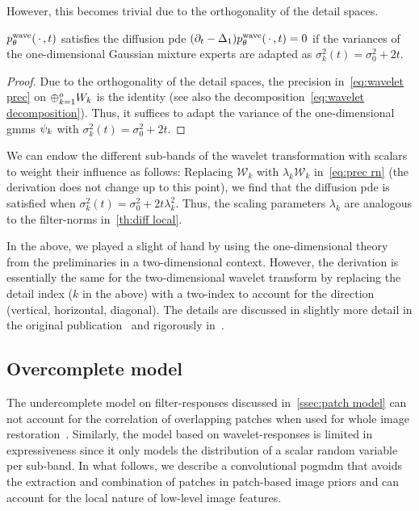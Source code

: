 However, this becomes trivial due to the orthogonality of the detail spaces.
\begin{theorem}%
	\label{th:wavelet diff}
	\( p^{\mathrm{wave}}_\theta(\,\cdot\,, t) \) satisfies the diffusion \gls{pde} \( (\partial_t - \Delta_{\num{1}}) p^{\mathrm{wave}}_\theta(\,\cdot\,, t) = \num{0} \) if the variances of the one-dimensional Gaussian mixture experts are adapted as \( \sigma_k^{\num{2}}(t) = \sigma_{\num{0}}^{\num{2}} + \num{2}t \).
\end{theorem}
\begin{proof}
	Due to the orthogonality of the detail spaces, the precision in~\cref{eq:wavelet prec} on \( \oplus_{k=\num{1}}^o W_k \) is the identity (see also the decomposition~\cref{eq:wavelet decomposition}).
	Thus, it suffices to adapt the variance of the one-dimensional \glspl{gmm} \( \psi_k \) with \( \sigma_k^{\num{2}}(t) = \sigma_{\num{0}}^{\num{2}} + \num{2}t \).
\end{proof}
We can endow the different sub-bands of the wavelet transformation with scalars to weight their influence as follows:
Replacing \( \mathcal{W}_k \) with \( \lambda_k \mathcal{W}_k \) in~\eqref{eq:prec rn} (the derivation does not change up to this point), we find that the diffusion \gls{pde} is satisfied when \( \sigma_k^{\num{2}}(t) = \sigma_{\num{0}}^{\num{2}} + \num{2}t \lambda_k^{\num{2}} \).
Thus, the scaling parameters \( \lambda_{k} \) are analogous to the filter-norms in~\cref{th:diff local}.

In the above, we played a slight of hand by using the one-dimensional theory from the preliminaries in a two-dimensional context.
However, the derivation is essentially the same for the two-dimensional wavelet transform by replacing the detail index (\( k \) in the above) with a two-index to account for the direction (vertical, horizontal, diagonal).
The details are discussed in slightly more detail in the original publication~\cite{zach_pogmdm_2024} and rigorously in~\cite[chapter 4.4]{bredies_mathematical_2018}.
\subsection{Overcomplete model}%
\label{ssec:conv model}
The undercomplete model on filter-responses discussed in~\cref{ssec:patch model} can not account for the correlation of overlapping patches when used for whole image restoration~\cite{RoBl09,zoran_learning_2011}.
Similarly, the model based on wavelet-responses is limited in expressiveness since it only models the distribution of a scalar random variable per sub-band.
In what follows, we describe a convolutional \gls{pogmdm} that avoids the extraction and combination of patches in patch-based image priors and can account for the local nature of low-level image features.


